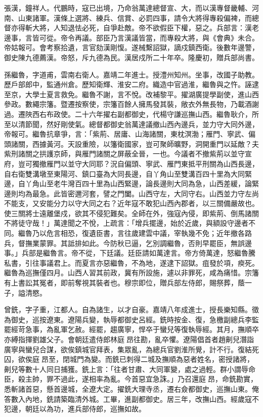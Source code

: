 \begin{pinyinscope}
張漢，鐘祥人。代鵬時，寇已出境，乃命翁萬達總督宣、大，而以漢專督畿輔、河南、山東諸軍。漢條上選將、練兵、信賞、必罰四事，請令大將得專殺偏裨，而總督亦得斬大將，人知退怯必死，自爭赴敵。帝不欲假臣下權，惡之。兵部言：漢老邊事，言皆可從。帝令再議。部臣乃言漢議皆當，而專殺大將，與《會典》未合。帝姑報可。會考察拾遺，言官劾漢剛愎。遂械繫詔獄，謫戍鎮西衛。後數年邊警，御史陳九德薦漢。帝怒，斥九德為民。漢居戍所二十年卒。隆慶初，贈兵部尚書。

孫繼魯，字道甫，雲南右衛人。嘉靖二年進士。授澧州知州。坐事，改國子助教。歷戶部郎中，監通州倉。歷知衛輝、淮安二府。織造中官過淮，繼魯與之忤。誣逮至京，大學士夏言救免。繼魯不謝，言不悅。改補黎平。擢湖廣提學副使，進山西參政。數繩宗籓。暨遷按察使，宗籓百餘人擁馬發其裝，敞衣外無長物，乃載酒謝過。遷陜西右布政使。二十六年擢右副都御史，代楊守謙巡撫山西。繼魯耿介，所至以清節聞，然好剛使氣。總督都御史翁萬達議撤山西內邊兵，並力守大同外邊，帝報可。繼魯抗章爭，言：「紫荊、居庸、山海諸關，東枕溟渤；雁門、寧武、偏頭諸關，西據黃河。天設重險，以籓衛國家，豈可聚師曠野，洞開重門以延敵？夫紫刑諸關之拱護京師，與雁門諸關之屏蔽全晉，一也。今議者不撤紫荊以並守宣府，豈可獨撤雁門以並守大同耶？況自偏頭、寧武、雁門東抵平刑關為山西長邊，自右衛雙溝墩至東陽河、鎮口臺為大同長邊，自丫角山至雙溝百四十里為大同緊邊，自丫角山至老牛灣百四十里為山西緊邊，論長邊則大同為急，山西差緩，論緊邊則均為最急。此皆密邇河套，譬之門闔。山西守左，大同守右。山西並力守左尚不能支，又安能分力以守大同之右？近年寇不敢犯山西內郡者，以三關備嚴故也。使三關將士遠離堡戍，欲其不侵犯難矣。全師在外，強寇內侵，即紫荊、倒馬諸關不將徒守哉！」萬達聞之不悅，上疏言：「增兵擺邊，始於近歲，與額設守邊者不同。繼魯乃以危言相恐，復遺臣書，言往歲建雲中議，宰執幾不免；近年撤各路兵，督撫業蒙罪。其詆排如此。今防秋已逼，乞別調繼魯，否則早罷臣，無誤邊事。」兵部是繼魯言。帝不從，下廷議。廷臣請如萬達言。帝方倚萬達，怒繼魯騰私書，引往事議君上。而夏言亦惡繼魯，不為地，遂逮下詔獄。疽發於項，瘐死。繼魯為巡撫僅四月。山西人習其前政，冀有所設施，遽以非罪死，咸為痛惜。宗籓有上書訟其冤者，即前奪視其裝者也。穆宗即位，贈兵部左侍郎，賜祭葬，蔭一子，謚清愍。

曾銑，字子重，江都人。自為諸生，以才自豪。嘉靖八年成進士，授長樂知縣。徵為御史，巡按遼東。遼陽兵變，執辱都御史呂經。銑時按金、復，急檄副總兵李監罷經苛急事，為亂軍乞赦。經罷，趨廣寧，悍卒于蠻兒等復執辱經。其月，撫順卒亦縛指揮劉雄父子。會朝廷遣侍郎林庭昂往勘，亂卒懼。遼陽倡首者趙劓兒潛詣廣寧與蠻兒合謀，欲俟鎮城官拜表，集眾亂，為總兵官劉淮所覺，計不行。復結死囚，欲俟庭昂至，閉城門為變。而銑已刺得二城及撫順為惡者姓名，密授諸將，劓兒等數十人同日捕獲。銑上言：「往者甘肅、大同軍變，處之過輕。群小謂辱命臣，殺主帥，罪不過此，遂相率為亂。今首惡宜急誅。」乃召還庭昂，命銑勘實，悉斬諸首惡，懸首邊城，全遼大定。擢銑大理寺丞，遷右僉都御史，巡撫山東。俺答數入內地，銑請築臨清外城。工畢，進副都御史。居三年，改撫山西。經歲寇不犯邊，朝廷以為功，進兵部侍郎，巡撫如故。


\end{pinyinscope}
